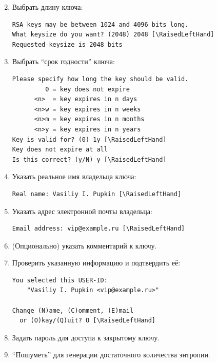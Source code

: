 \documentclass[presentation]{beamer}
\newcommand{\RaisedLeftHand}{%
  \raisebox{-.50em}{\Large\HandLeft}
}
\begin{document}
\begin{frame}[fragile]{}
  \begin{enumerate}
    \setcounter{enumi}{1}
  \item Выбрать длину ключа:
    \small
\begin{Verbatim}[commandchars=\\\[\]]
RSA keys may be between 1024 and 4096 bits long.
What keysize do you want? (2048) 2048 [\RaisedLeftHand]
Requested keysize is 2048 bits
\end{Verbatim}
\normalsize
\item Выбрать ``срок годности'' ключа:
  \small
\begin{Verbatim}[commandchars=\\\[\]]
Please specify how long the key should be valid.
         0 = key does not expire
      <n>  = key expires in n days
      <n>w = key expires in n weeks
      <n>m = key expires in n months
      <n>y = key expires in n years
Key is valid for? (0) 1y [\RaisedLeftHand]
Key does not expire at all
Is this correct? (y/N) y [\RaisedLeftHand]
\end{Verbatim}
\normalsize
    \end{enumerate}
\end{frame}

\begin{frame}[fragile]{}
  \begin{enumerate}
    \setcounter{enumi}{3}
  \item Указать реальное имя владельца ключа:
    \small
\begin{Verbatim}[commandchars=\\\[\]]
Real name: Vasiliy I. Pupkin [\RaisedLeftHand]
\end{Verbatim}
  \item Указать адрес электронной почты владельца:
\begin{Verbatim}[commandchars=\\\[\]]
Email address: vip@example.ru [\RaisedLeftHand]
\end{Verbatim}

  \item (Опционально) указать комментарий к ключу.
\item Проверить указанную информацию и подтвердить её:
  \small
  \begin{Verbatim}[commandchars=\\\[\]]
You selected this USER-ID:
    "Vasiliy I. Pupkin <vip@example.ru>"

Change (N)ame, (C)omment, (E)mail
  or (O)kay/(Q)uit? O [\RaisedLeftHand]
  \end{Verbatim}
  \normalsize
\item Задать пароль для доступа к закрытому ключу.
\item ``Пошуметь'' для генерации достаточного количества энтропии.
    \end{enumerate}

\end{frame}
\end{document}
